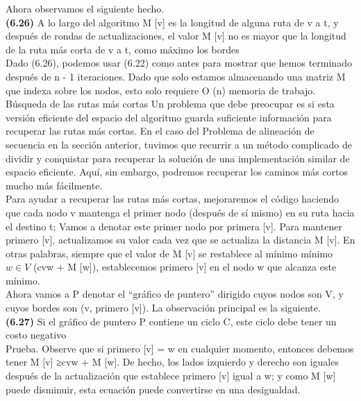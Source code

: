\documentclass[a4paper, 12pt]{book}
\theoremstyle{dotless}
\begin{document}
Ahora observamos el siguiente hecho.\\

\textbf{(6.26)} A lo largo del algoritmo M [v] es la longitud de alguna ruta de v a t, y después de rondas de actualizaciones, el valor M [v] no es mayor que la longitud de la ruta más corta de v a t, como máximo los bordes\\

Dado (6.26), podemos usar (6.22) como antes para mostrar que hemos terminado después de n - 1 iteraciones. Dado que solo estamos almacenando una matriz M que indexa sobre los nodos, esto solo requiere O (n) memoria de trabajo.\\

Búsqueda de las rutas más cortas Un problema que debe preocupar es si esta versión eficiente del espacio del algoritmo guarda suficiente información para recuperar las rutas más cortas. En el caso del Problema de alineación de secuencia en la sección anterior, tuvimos que recurrir a un método complicado de dividir y conquistar para recuperar la solución de una implementación similar de espacio eficiente. Aquí, sin embargo, podremos recuperar los caminos más cortos mucho más fácilmente.\\

Para ayudar a recuperar las rutas más cortas, mejoraremos el código haciendo que cada nodo v mantenga el primer nodo (después de sí mismo) en su ruta hacia el destino t; Vamos a denotar este primer nodo por primera [v]. Para mantener primero [v], actualizamos su valor cada vez que se actualiza la distancia M [v]. En otras palabras, siempre que el valor de M [v] se restablece al mínimo mínimo $w \in V$ (cvw + M [w]), establecemos primero [v] en el nodo w que alcanza este mínimo.\\

Ahora vamos a P denotar el ``gráfico de puntero'' dirigido cuyos nodos son V, y cuyos bordes son {(v, primero [v])}. La observación principal es la siguiente.\\

\textbf{(6.27)} Si el gráfico de puntero P contiene un ciclo C, este ciclo debe tener un costo negativo\\

Prueba. Observe que si primero [v] = w en cualquier momento, entonces debemos tener M [v] ≥cvw + M [w]. De hecho, los lados izquierdo y derecho son iguales después de la actualización que establece primero [v] igual a w; y como M [w] puede disminuir, esta ecuación puede convertirse en una desigualdad.\\
\end{document}
